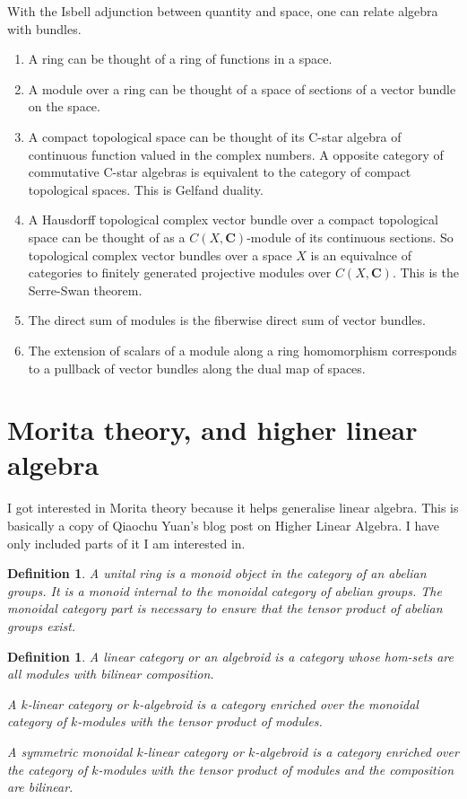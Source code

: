 \documentclass{tufte-book}
\newtheorem{definition}[theorem]{Definition}
\begin{document}
With the Isbell adjunction between quantity and space, one can relate algebra with bundles.

\begin{enumerate}
	\item A ring can be thought of a ring of functions in a space.
	\item A module over a ring can be thought of a space of sections of a vector bundle on the space.
	\item A compact topological space can be thought of its C-star algebra of continuous function valued in the complex numbers. A opposite category of commutative C-star algebras is equivalent to the category of compact topological spaces. This is Gelfand duality.
	\item A Hausdorff topological complex vector bundle over a compact topological space can be thought of as a $C(X, \mathbf{C})$-module of its continuous sections. So topological complex vector bundles over a space $X$ is an equivalnce of categories to finitely generated projective modules over $C(X, \mathbf{C})$. This is the Serre-Swan theorem.
	\item The direct sum of modules is the fiberwise direct sum of vector bundles.
	\item The extension of scalars of a module along a ring homomorphism corresponds to a pullback of vector bundles along the dual map of spaces.
\end{enumerate}

\section{Morita theory, and higher linear algebra}

I got interested in Morita theory because it helps generalise linear algebra. This is basically a copy of Qiaochu Yuan's blog post on Higher Linear Algebra. I have only included parts of it I am interested in.

\begin{definition}
	A unital ring is a monoid object in the category of an abelian groups. It is a monoid internal to the monoidal category of abelian groups. The monoidal category part is necessary to ensure that the tensor product of abelian groups exist.
\end{definition}

\begin{definition}
	A linear category or an algebroid is a category whose hom-sets are all modules with bilinear composition.

	A $k$-linear category or $k$-algebroid is a category enriched over the monoidal category of $k$-modules with the tensor product of modules.

	A symmetric monoidal $k$-linear category or $k$-algebroid is a category enriched over the category of $k$-modules with the tensor product of modules and the composition are bilinear. 
\end{definition}
\end{document}
